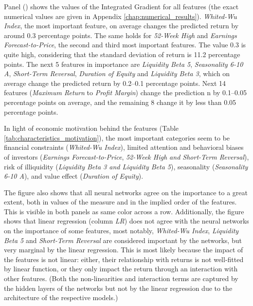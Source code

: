 		Panel () shows the values of the Integrated Gradient for all features (the exact numerical values are given in Appendix \ref{chap:numerical_results}). \textit{Whited-Wu Index}, the most important feature, on average changes the predicted return by around 0.3 percentage points. The same holds for \textit{52-Week High} and \textit{Earnings Forecast-to-Price}, the second and third most important features. The value 0.3 is quite high, considering that the standard deviation of return is 11.2 percentage points. The next 5 features in importance are \textit{Liquidity Beta 5}, \textit{Seasonality 6-10 A}, \textit{Short-Term Reversal}, \textit{Duration of Equity} and \textit{Liquidity Beta 3}, which on average change the predicted return by 0.2--0.1 percentage points. Next 14 features (\textit{Maximum Return} to \textit{Profit Margin}) change the prediction n by 0.1--0.05 percentage points on average, and the remaining 8 change it by less than 0.05 percentage points.
		
		In light of economic motivation behind the features (Table \ref{tab:characteristics_motivation}), the most important categories seem to be financial constraints (\textit{Whited-Wu Index}), limited attention and behavioral biases of investors (\textit{Earnings Forecast-to-Price}, \textit{52-Week High and Short-Term Reversal}), risk of illiquidity (\textit{Liquidity Beta 3 and Liquidity Beta 5}), seasonality (\textit{Seasonality 6-10 A}), and value effect (\textit{Duration of Equity}). 
		
		The figure also shows that all neural networks agree on the importance to a great extent, both in values of the measure and in the implied order of the features. This is visible in both panels as same color across a row. Additionally, the figure shows that linear regression (column \textit{LR}) does not agree with the neural networks on the importance of some features, most notably, \textit{Whited-Wu Index}, \textit{Liquidity Beta 5} and \textit{Short-Term Reversal} are considered important by the networks, but very marginal by the linear regression. This is most likely because the impact of the features is not linear: either, their relationship with returns is not well-fitted by linear function, or they only impact the return through an interaction with other features. (Both the non-linearities and interaction terms are captured by the hidden layers of the networks but not by the linear regression due to the architecture of the respective models.)  	
	

